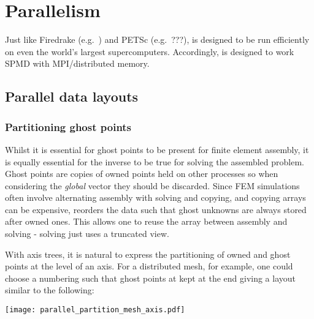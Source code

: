 \documentclass[thesis]{subfiles}
\begin{document}
\chapter{Parallelism}
\label{chapter:parallel}

Just like Firedrake (e.g.~\cite{betteridgeCodeGenerationProductive2021}) and PETSc (e.g.~???),  is designed to be run efficiently on even the world's largest supercomputers.
Accordingly,  is designed to work SPMD with MPI/distributed memory.

\section{Parallel data layouts}


\subsection{Partitioning ghost points}

Whilst it is essential for ghost points to be present for finite element assembly, it is equally essential for the inverse to be true for solving the assembled problem.
Ghost points are copies of owned points held on other processes so when considering the \textit{global} vector they should be discarded.
Since FEM simulations often involve alternating assembly with solving and copying, and copying arrays can be expensive,  reorders the data such that ghost unknowns are always stored after owned ones.
This allows one to reuse the array between assembly and solving - solving just uses a truncated view.

With axis trees, it is natural to express the partitioning of owned and ghost points at the level of an axis.
For a distributed mesh, for example, one could choose a numbering such that ghost points at kept at the end giving a layout similar to the following:

\begin{center}
  \texttt{[image: parallel\_partition\_mesh\_axis.pdf]}
\end{center}
\end{document}
